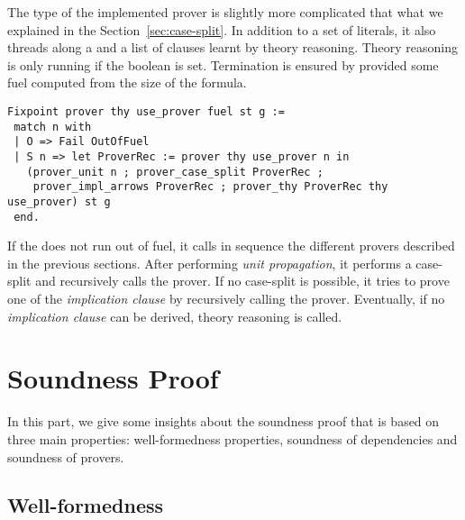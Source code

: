 \documentclass[utf8,a4paper,UKenglish,cleveref, autoref, thm-restate]{lipics-v2019}
\begin{document}
The type of the implemented prover is slightly more complicated that what we explained in the Section~\ref{sec:case-split}.
In addition to a set of literals, it also threads along a  and a list of clauses learnt by theory reasoning.
Theory reasoning is only running if the boolean  is set.
%
Termination is ensured by provided some fuel computed from the size of the formula. 
\begin{verbatim}
Fixpoint prover thy use_prover fuel st g :=
 match n with
 | O => Fail OutOfFuel
 | S n => let ProverRec := prover thy use_prover n in
   (prover_unit n ; prover_case_split ProverRec ;
    prover_impl_arrows ProverRec ; prover_thy ProverRec thy use_prover) st g
 end.
\end{verbatim}
If the  does not run out of fuel, it calls in sequence
the different provers described in the previous sections.  After
performing \emph{unit propagation}, it performs a case-split and
recursively calls the prover. If no case-split is possible, it tries
to prove one of the \emph{implication clause} by recursively calling
the prover. Eventually, if no \emph{implication clause} can be
derived, theory reasoning is called.

\section{Soundness Proof}
\label{sec:soundness-proof}
In this part, we give some insights about the soundness proof that is
based on three main properties: well-formedness properties, soundness of
dependencies and soundness of provers.

\subsection{Well-formedness}
\end{document}
